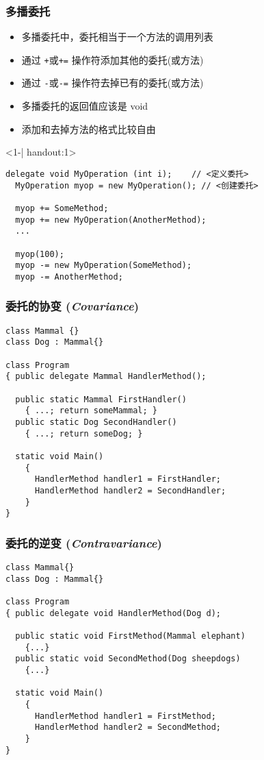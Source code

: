 \begin{frame}[fragile]
\frametitle{多播委托}
\begin{itemize}
\setlength{\itemsep}{4pt plus 1pt}
\item<1-| handout:1> 多播委托中，委托相当于一个方法的调用列表
\item<2-| handout:1> 通过 \texttt{+}或\texttt{+=} 操作符添加其他的委托(或方法)
\item<2-| handout:1> 通过 \texttt{-}或\texttt{-=} 操作符去掉已有的委托(或方法)
\item<3-| handout:1> 多播委托的返回值应该是 void
\item<3-| handout:1> 添加和去掉方法的格式比较自由
\end{itemize}
\begin{onlyenv}<1-| handout:1>
\begin{lstlisting}[escapeinside=<>]
  delegate void MyOperation (int i);    // <定义委托>
  MyOperation myop = new MyOperation(); // <创建委托>

  myop += SomeMethod;
  myop += new MyOperation(AnotherMethod);
  ...

  myop(100);
  myop -= new MyOperation(SomeMethod);
  myop -= AnotherMethod;

\end{lstlisting}
\end{onlyenv}
\end{frame}

\begin{frame}[fragile]
\frametitle{委托的协变 (\textit{Covariance})}
\begin{lstlisting}
class Mammal {}
class Dog : Mammal{}

class Program
{ public delegate Mammal HandlerMethod();

  public static Mammal FirstHandler()  
    { ...; return someMammal; }
  public static Dog SecondHandler()
    { ...; return someDog; }

  static void Main() 
    {
      HandlerMethod handler1 = FirstHandler;
      HandlerMethod handler2 = SecondHandler;
    }
}
\end{lstlisting}
\end{frame}

\begin{frame}[fragile]
\frametitle{委托的逆变 (\textit{Contravariance})}
\begin{lstlisting}
class Mammal{}
class Dog : Mammal{}
 
class Program
{ public delegate void HandlerMethod(Dog d);
 
  public static void FirstMethod(Mammal elephant)
    {...}
  public static void SecondMethod(Dog sheepdogs)
    {...}
 
  static void Main()
    {
      HandlerMethod handler1 = FirstMethod;
      HandlerMethod handler2 = SecondMethod;
    }
}
\end{lstlisting}
\end{frame}

